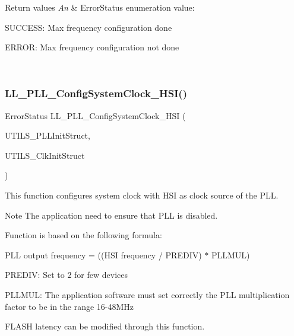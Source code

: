 \begin{DoxyRetVals}{Return values}
{\em An} & Error\+Status enumeration value\+:
\begin{DoxyItemize}
\item S\+U\+C\+C\+E\+SS\+: Max frequency configuration done
\item E\+R\+R\+OR\+: Max frequency configuration not done 
\end{DoxyItemize}\\
\hline
\end{DoxyRetVals}
\mbox{\label{group___u_t_i_l_s___e_f___s_y_s_t_e_m_ga7ada5e4210f6ef80ef9f55bf9dd048c6}} 
\subsubsection{\texorpdfstring{L\+L\+\_\+\+P\+L\+L\+\_\+\+Config\+System\+Clock\+\_\+\+H\+S\+I()}{LL\_PLL\_ConfigSystemClock\_HSI()}}
{\footnotesize\ttfamily Error\+Status L\+L\+\_\+\+P\+L\+L\+\_\+\+Config\+System\+Clock\+\_\+\+H\+SI (\begin{DoxyParamCaption}\item[{\hyperlink{struct_l_l___u_t_i_l_s___p_l_l_init_type_def}{L\+L\+\_\+\+U\+T\+I\+L\+S\+\_\+\+P\+L\+L\+Init\+Type\+Def} $\ast$}]{U\+T\+I\+L\+S\+\_\+\+P\+L\+L\+Init\+Struct,  }\item[{\hyperlink{struct_l_l___u_t_i_l_s___clk_init_type_def}{L\+L\+\_\+\+U\+T\+I\+L\+S\+\_\+\+Clk\+Init\+Type\+Def} $\ast$}]{U\+T\+I\+L\+S\+\_\+\+Clk\+Init\+Struct }\end{DoxyParamCaption})}



This function configures system clock with H\+SI as clock source of the P\+LL. 

\begin{DoxyNote}{Note}
The application need to ensure that P\+LL is disabled. 

Function is based on the following formula\+:
\begin{DoxyItemize}
\item P\+LL output frequency = ((H\+SI frequency / P\+R\+E\+D\+IV) $\ast$ P\+L\+L\+M\+UL)
\item P\+R\+E\+D\+IV\+: Set to 2 for few devices
\item P\+L\+L\+M\+UL\+: The application software must set correctly the P\+LL multiplication factor to be in the range 16-\/48\+M\+Hz 
\end{DoxyItemize}

F\+L\+A\+SH latency can be modified through this function. 
\end{DoxyNote}


